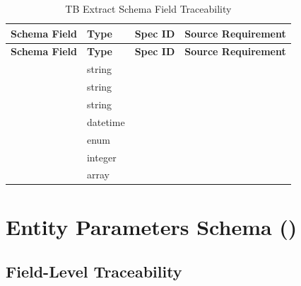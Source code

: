 \begin{longtable}{@{}L{4cm}L{2.5cm}C{2cm}L{4.5cm}@{}}
\caption{TB Extract Schema Field Traceability}
\label{tab:tb-extract-fields} \\
\toprule
\textbf{Schema Field} & \textbf{Type} & \textbf{Spec ID} & \textbf{Source Requirement} \\
\midrule
\endfirsthead
\toprule
\textbf{Schema Field} & \textbf{Type} & \textbf{Spec ID} & \textbf{Source Requirement} \\
\midrule
\endhead
{} & string &  &  \\
 & string &  &  \\
 & string &  &  \\
 & datetime &  &  \\
 & enum &  &  \\
 & integer &  &  \\
 & array &  &  \\
\bottomrule
\end{longtable}

\section{Entity Parameters Schema ()}
\label{sec:entity-params-schema}

\subsection{Field-Level Traceability}

